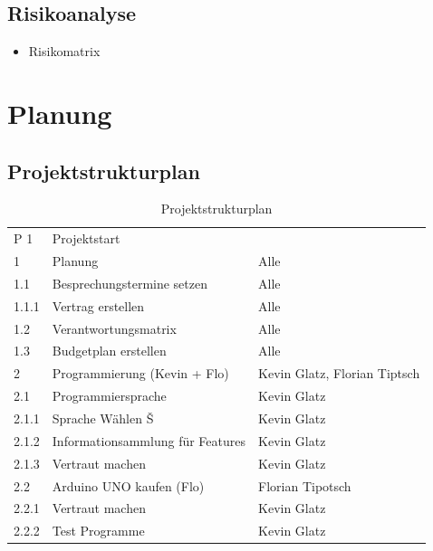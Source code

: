 \subsection{Risikoanalyse}
\begin{itemize}
	\item Risikomatrix
\end{itemize}

\section{Planung}
\subsection{Projektstrukturplan}
\def \currentAuthor{Florian Tipotsch}
\newpage
\begin{table}[H]
	\centering
	\caption{Projektstrukturplan}
	\label{projektstrukturplan}
	\begin{tabular}{lll}
		P 1   & Projektstart                     &                                \\
		1     & Planung                          & Alle                           \\
		1.1   & Besprechungstermine setzen       & Alle                           \\
		1.1.1 & Vertrag erstellen                & Alle                           \\
		1.2   & Verantwortungsmatrix             & Alle                           \\
		1.3   & Budgetplan erstellen             & Alle                           \\
		2     & Programmierung (Kevin + Flo)     & Kevin Glatz, Florian Tiptsch   \\
		2.1   & Programmiersprache               & Kevin Glatz                    \\
		2.1.1 & Sprache Wählen Š                 & Kevin Glatz                    \\
		2.1.2 & Informationsammlung für Features & Kevin Glatz                    \\
		2.1.3 & Vertraut machen                  & Kevin Glatz                    \\
		2.2   & Arduino UNO kaufen (Flo)         & Florian Tipotsch               \\
		2.2.1 & Vertraut machen                  & Kevin Glatz                    \\
		2.2.2 & Test Programme                   & Kevin Glatz                    \\

\end{tabular}
\end{table}
